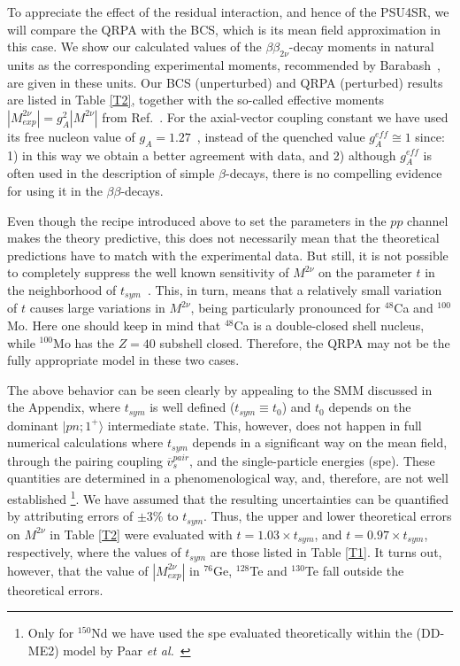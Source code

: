 \documentclass[nofootinbib,twocolumn,eqsecnum,floats,aps]{revtex4}
\def\sss{\scriptscriptstyle}
\def\x{\times}
\def\ket#1{|#1 \rangle}
\def\etal {{\it et al.}}
\def\b {{\beta}}
\def\sss{\scriptscriptstyle}
\begin{document}
{To appreciate the effect of the residual interaction,
and hence of the PSU4SR, %
we will compare the QRPA with the  BCS, which
is its mean field approximation in this case.
We show our calculated values of the $\beta\beta_{2\nu}$-decay moments
in natural units as the corresponding experimental moments,
recommended by  Barabash~\cite{Bar15},  are given in these units.
Our BCS (unperturbed) and QRPA (perturbed) results  are listed in Table \ref{T2},
together with  the so-called effective
moments $|M^{2\nu}_{exp}|= g^2_{\sss A} | M^{2\nu}|$ from Ref.~\cite{Bar15}.
For the axial-vector  coupling constant we have
used  its free nucleon value of $g_{\sss A} = 1.27$~\cite{Ber12},
instead of the quenched value $g_{\sss A}^{eff}\cong 1$ since: 1) in this
way we obtain a better agreement with data, and 2) although
$g_{\sss A}^{eff}$ is often used in the description of simple
$\beta$-decays, there is no compelling evidence for using it in
the $\b\b$-decays.


 Even though the recipe introduced above  to set the parameters in the $pp$ channel makes
the theory  predictive, this does not necessarily mean that the theoretical
predictions have to match with the experimental data. But still,
it is not possible to completely suppress the well known sensitivity
of  $M^{2\nu}$  on the parameter $t$ in the neighborhood
of  $t_{sym}$~\cite{Krm94,Krm97}.
This, in turn, means that a relatively small variation of $t$ causes large
variations in $M^{2\nu}$, being particularly pronounced for  $^{48}$Ca
and $^{100}$Mo.
Here one should keep in mind that  $^{48}$Ca is a double-closed shell nucleus,
while  $^{100}$Mo has the $Z=40$ subshell closed.
Therefore, the QRPA may not be the fully appropriate model in these two cases.

The  above behavior  can be  seen clearly by appealing to the SMM
discussed in the Appendix, where $t_{sym }$ is well defined ($t_{sym }\equiv t_0$)
and $ t_0$ depends on the dominant $\ket{pn;1^+}$ intermediate state.
This, however, does not happen in full numerical calculations where  $t_{sym }$
depends in a significant way on  the mean field, through the pairing coupling
${\overline v}_s^{pair}$, and the
 single-particle energies (spe). These quantities are determined in a phenomenological way,
and, therefore,  are not well established
\footnote{ Only for  $^{150}$Nd we have used the spe evaluated theoretically within the (DD-ME2) model
by Paar \etal~\cite{Paa03}}.
We have assumed  that the resulting  uncertainties can be quantified by attributing
errors of $\pm 3\%$ to $t_{sym}$.
Thus, the upper and lower theoretical errors on $M^{2\nu}$ in Table \ref{T2}
were evaluated with $t=1.03\x t_{sym}$,
and $t=0.97\x t_{sym}$, respectively, where the values of $t_{sym}$
are those listed in Table \ref{T1}.
It turns out, however, that the value of
$|M^{2\nu}_{exp}|$ in {$^{76}$Ge}, {$^{128}$Te} and {$^{130}$Te} fall outside
the theoretical errors.

}
\end{document}

